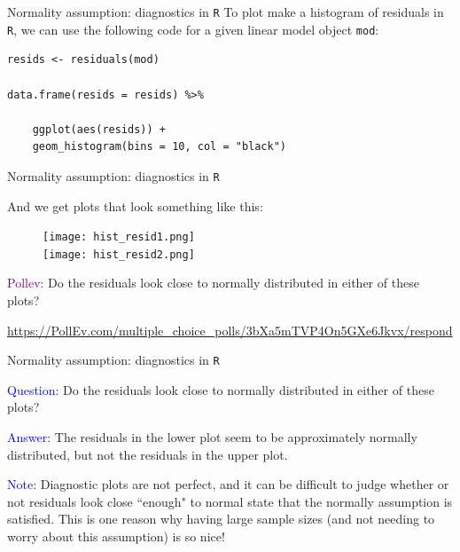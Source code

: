 \documentclass[10pt,t]{beamer}
\begin{document}
\begin{frame}[fragile]{Normality assumption: diagnostics in \texttt{R}}
To plot make a histogram of residuals in \texttt{R}, we can use the following code for a given linear model object \texttt{mod}:

\vspace{0.3cm}

\begin{lstlisting}
resids <- residuals(mod)

data.frame(resids = resids) %>%

    ggplot(aes(resids)) +
    geom_histogram(bins = 10, col = "black")
\end{lstlisting}

\end{frame}

\begin{frame}{Normality assumption: diagnostics in \texttt{R}}
	
	\vspace{-5 mm}
	
And we get plots that look something like this:

	
\begin{figure}
	\centering 
	\texttt{[image: hist\_resid1.png]} \\
    \texttt{[image: hist\_resid2.png]}
\end{figure}

\textcolor{purple}{Pollev:} Do the residuals look close to normally distributed in either of these plots?
\smallskip

\footnotesize{\url{https://PollEv.com/multiple_choice_polls/3bXa5mTVP4On5GXe6Jkvx/respond}}

\end{frame}

\begin{frame}{Normality assumption: diagnostics in \texttt{R}}

\textcolor{blue}{Question:} Do the residuals look close to normally distributed in either of these plots?

\vspace{0.3cm}

\textcolor{blue}{Answer:} The residuals in the lower plot seem to be approximately normally distributed, but not the residuals in the upper plot.

\vspace{0.3cm}

\textcolor{blue}{Note:} Diagnostic plots are not perfect, and it can be difficult to judge whether or not residuals look close ``enough" to normal state that the normally assumption is satisfied. This is one reason why having large sample sizes (and not needing to worry about this assumption) is so nice!

\end{frame}
\end{document}
